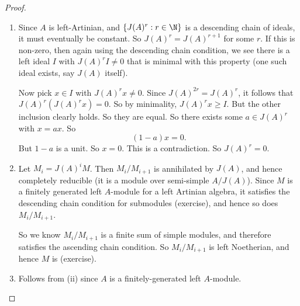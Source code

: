 \documentclass[a4paper]{article}
\begin{document}
\begin{proof}\leavevmode
  \begin{enumerate}
    \item Since $A$ is left-Artinian, and $\{J(A)^r: r \in \N\}$ is a descending chain of ideals, it must eventually be constant. So $J(A)^r = J(A)^{r + 1}$ for some $r$. If this is non-zero, then again using the descending chain condition, we see there is a left ideal $I$ with $J(A)^r I \not= 0$ that is minimal with this property (one such ideal exists, say $J(A)$ itself).

      Now pick $x \in I$ with $J(A)^r x \not = 0$. Since $J(A)^{2r} = J(A)^r$, it follows that $J(A)^r (J(A)^r x) = 0$. So by minimality, $J(A)^r x \geq I$. But the other inclusion clearly holds. So they are equal. So there exists some $a \in J(A)^r$ with $x = ax$. So
      \[
        (1 - a) x = 0.
      \]
      But $1 - a$ is a unit. So $x = 0$. This is a contradiction. So $J(A)^r = 0$.
    \item Let $M_i = J(A)^i M$. Then $M_i/M_{i + 1}$ is annihilated by $J(A)$, and hence completely reducible (it is a module over semi-simple $A/J(A)$). Since $M$ is a finitely generated left $A$-module for a left Artinian algebra, it satisfies the descending chain condition for submodules (exercise), and hence so does $M_i/M_{i + 1}$. %

      So we know $M_i/M_{i + 1}$ is a finite sum of simple modules, and therefore satisfies the ascending chain condition. So $M_i/M_{i + 1}$ is left Noetherian, and hence $M$ is (exercise).

    \item Follows from (ii) since $A$ is a finitely-generated left $A$-module.
  \end{enumerate}
\end{proof}

%
\end{document}

